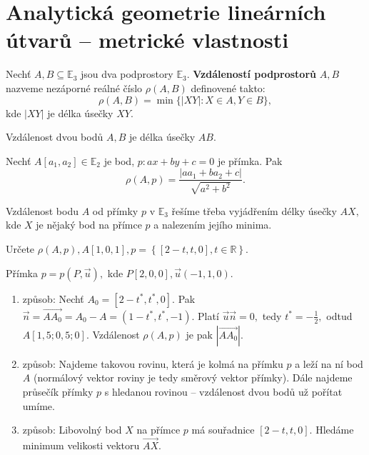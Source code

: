 \section{Analytická geometrie lineárních útvarů -- metrické vlastnosti}
\begin{definition}
    Nechť $A,B\subseteq \mathbb E_3$ jsou dva podprostory $\mathbb E_3$. \textbf{Vzdáleností
    podprostorů} $A,B$ nazveme nezáporné reálné číslo $\rho(A,B)$ definovené takto:
    $$\rho(A,B) = \min \{ |XY|: X\in A, Y\in B \},$$
    kde $|XY|$ je délka úsečky $XY.$
\end{definition}

\begin{veta}
    Vzdálenost dvou bodů $A,B$ je délka úsečky $AB.$
\end{veta}

\begin{veta}
    Nechť $A[a_1,a_2]\in \mathbb E_2$ je bod, $p:ax+by+c=0$ je přímka. Pak
    $$\rho(A,p)=\frac{|aa_1+ba_2+c|}{\sqrt{a^2+b^2} }.$$
\end{veta}

\begin{pozn}
    Vzdálenost bodu $A$ od přímky $p$ v $\mathbb E_3$ řešíme třeba vyjádřením délky úsečky
    $AX,$ kde $X$ je nějaký bod na přímce $p$ a nalezením jejího minima.
\end{pozn}

\begin{priklad}
Určete $\rho(A,p), A[1,0,1], p=\left \{ [2-t,t,0],t \in \mathbb R \right \} $.
\end{priklad}

\begin{reseni}
Přímka $p=p(P,\vec u), $ kde $P[2,0,0],\vec u(-1,1,0).$
\begin{enumerate}[1.]
\item způsob: Nechť $A_0=[2-t^*,t^*,0]$. Pak $\vec n = \overrightarrow{AA_0}=A_0-A=(1-t^*,t^*,-1).$
Platí $\vec u\vec n=0,$ tedy $t^*=-\frac{1}{2},$ odtud $A[1,5;0,5;0].$ Vzdálenost
$\rho(A,p)$ je pak $|\overrightarrow{AA_0}|.$
\item způsob: Najdeme takovou rovinu, která je kolmá na přímku $p$ a leží na ní bod $A$
(normálový vektor roviny je tedy směrový vektor přímky). Dále najdeme průsečík přímky
$p$ s hledanou rovinou -- vzdálenost dvou bodů už pořítat umíme.
\item způsob: Libovolný bod $X$ na přímce $p$ má souřadnice $[2-t,t,0]$. Hledáme
minimum velikosti vektoru $\overrightarrow{AX}.$
\end{enumerate}
\end{reseni}

